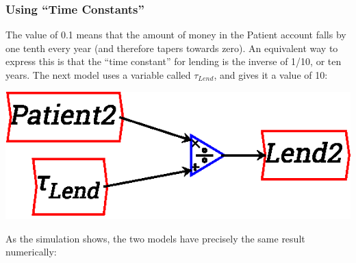 \subsubsection{Using ``Time Constants''}
\label{time-constants}

The value of 0.1 means that the amount of money in the Patient account
falls by one tenth every year (and therefore tapers towards zero). An
equivalent way to express this is that the ``time constant'' for
lending is the inverse of 1/10, or ten years. The next model uses a
variable called $\tau_{Lend}$, and gives it a value of 10: 

\begin{center}
\includegraphics{images/NewItem158.eps}
\end{center}

As the simulation shows, the two models have precisely the same result
numerically:

